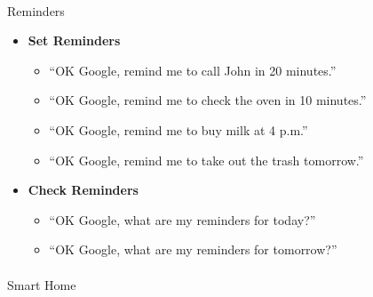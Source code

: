 \documentclass[
  a4paper,
]{article}
\makeatletter
\let\oldparagraph\paragraph
\renewcommand{\paragraph}{
    \@ifstar
      \xxxParagraphStar
      \xxxParagraphNoStar
  }
\newcommand{\xxxParagraphStar}[1]{\oldparagraph*{#1}\mbox{}}
\newcommand{\xxxParagraphNoStar}[1]{\oldparagraph{#1}\mbox{}}
\providecommand{\tightlist}{%
  \setlength{\itemsep}{0pt}\setlength{\parskip}{0pt}}\usepackage{longtable,booktabs,array}
\makeatother
\begin{document}
\paragraph{Reminders}\label{reminders}

\begin{itemize}
\tightlist
\item
  \textbf{Set Reminders}

  \begin{itemize}
  \tightlist
  \item
    ``OK Google, remind me to call John in 20 minutes.''
  \item
    ``OK Google, remind me to check the oven in 10 minutes.''
  \item
    ``OK Google, remind me to buy milk at 4 p.m.''
  \item
    ``OK Google, remind me to take out the trash tomorrow.''
  \end{itemize}
\item
  \textbf{Check Reminders}

  \begin{itemize}
  \tightlist
  \item
    ``OK Google, what are my reminders for today?''
  \item
    ``OK Google, what are my reminders for tomorrow?''
  \end{itemize}
\end{itemize}

\paragraph{Smart Home}\label{smart-home}
\end{document}
